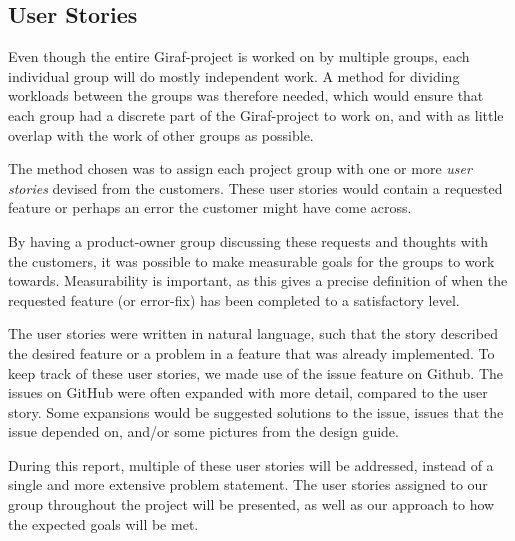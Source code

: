 \subsection{User Stories} \label{ssec:UserStories}
Even though the entire Giraf-project is worked on by multiple groups, each individual group will do mostly independent work.
A method for dividing workloads between the groups was therefore needed, which would ensure that each group had a discrete part of the Giraf-project to work on, and with as little overlap with the work of other groups as possible.

The method chosen was to assign each project group with one or more \textit{user stories} devised from the customers.
These user stories would contain a requested feature or perhaps an error the customer might have come across.

By having a product-owner group discussing these requests and thoughts with the customers, it was possible to make measurable goals for the groups to work towards.
Measurability is important, as this gives a precise definition of when the requested feature (or error-fix) has been completed to a satisfactory level.

The user stories were written in natural language, such that the story described the desired feature or a problem in a feature that was already implemented.
To keep track of these user stories, we made use of the issue feature on Github.
The issues on GitHub were often expanded with more detail, compared to the user story.
Some expansions would be suggested solutions to the issue, issues that the issue depended on, and/or some pictures from the design guide.

During this report, multiple of these user stories will be addressed, instead of a single and more extensive problem statement.
The user stories assigned to our group throughout the project will be presented, as well as our approach to how the expected goals will be met.
